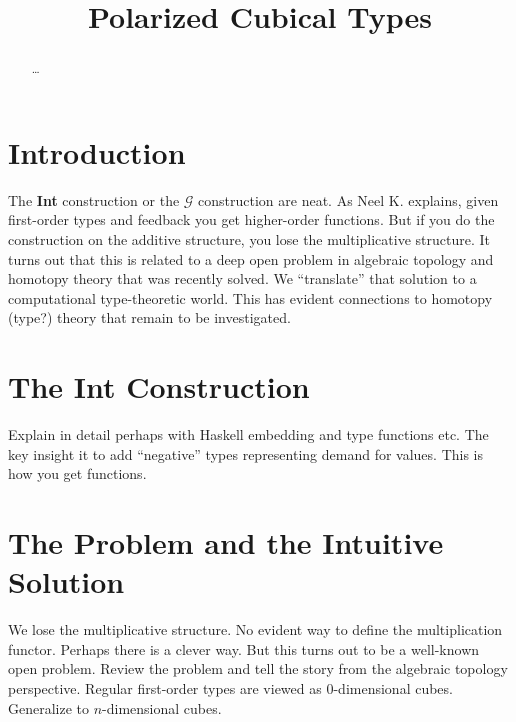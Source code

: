 \documentclass[authoryear,preprint]{sigplanconf}
\begin{document}
\lstset{breaklines=true, breakatwhitespace=true}
\lstset{numbers=none, numbersep=5pt, stepnumber=2, numberstyle=\scriptsize}
\lstset{rangeprefix=/*!\ , rangesuffix=\ !*\/, includerangemarker=false}

\title{Polarized Cubical Types}
\authorinfo{}{}{}
\maketitle

\begin{abstract}
\ldots
\end{abstract}

\section{Introduction}

The \textbf{Int} construction or the $\mathcal{G}$ construction are neat. As
Neel K. explains, given first-order types and feedback you get higher-order
functions. But if you do the construction on the additive structure, you lose
the multiplicative structure. It turns out that this is related to a deep
open problem in algebraic topology and homotopy theory that was recently
solved. We ``translate'' that solution to a computational type-theoretic
world. This has evident connections to homotopy (type?) theory that remain to
be investigated.

\section{The \textbf{Int} Construction} 

Explain in detail perhaps with Haskell embedding and type functions etc. The
key insight it to add ``negative'' types representing demand for values. This
is how you get functions.

\section{The Problem and the Intuitive Solution}

We lose the multiplicative structure. No evident way to define the
multiplication functor. Perhaps there is a clever way. But this turns out to
be a well-known open problem. Review the problem and tell the story from the
algebraic topology perspective. Regular first-order types are viewed as
$0$-dimensional cubes. Generalize to $n$-dimensional cubes.
\end{document}
